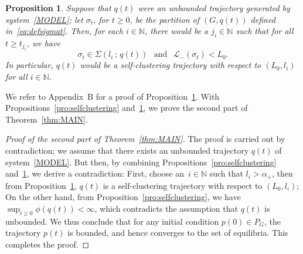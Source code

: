 \documentclass[10pt,twocolumn,twoside]{IEEEtran}
\newtheorem{pro}{Proposition}
\renewcommand{\cal}{\mathcal}
\renewcommand{\(}{\left (}
\renewcommand{\)}{\right )}
\renewcommand{\;}{\,;\,}
\newcommand{\N}{\mathbb{N}}
\begin{document}
\begin{pro}\label{pro:relatepartitiontodynamicalsystem}
Suppose that $q(t)$ were an unbounded trajectory generated by system~\eqref{MODEL};   
let $\sigma_{t}$, for $t\ge 0$, be the partition of $(G,q(t))$ defined in~\eqref{eq:defsigmat}. Then, for each $i\in \N$, there would be a $j_i\in \N$ such that for all $t \ge t_{j_i}$, we have
\begin{equation*}\label{eq:contradictioncondition1}
\sigma_t\in \Sigma(l_i\; q(t)) \hspace{5pt} \mbox{ and } \hspace{5pt}  \cal{L}_-(\sigma_t) <  L_0. 
\end{equation*}
In particular, $q(t)$ would be a self-clustering trajectory with respect to $(L_0, l_i)$ for all $i\in \N$. 
\end{pro}



We refer to Appendix~B for a proof of Proposition~\ref{pro:relatepartitiontodynamicalsystem}. With Propositions~\ref{pro:selfclustering} and~\ref{pro:relatepartitiontodynamicalsystem}, we prove the second part of Theorem~\ref{thm:MAIN}. 


\begin{proof}[Proof of the second part of Theorem~\ref{thm:MAIN}]
The proof is carried out by contradiction; we assume that there exists an unbounded trajectory $q(t)$ of system~\eqref{MODEL}.  But then, 
by combining Propositions~\ref{pro:selfclustering} and~\ref{pro:relatepartitiontodynamicalsystem}, we derive a contradiction:  First, choose an~$i\in \N$ such that $l_i > \alpha_+$, then from Proposition~\ref{pro:relatepartitiontodynamicalsystem}, $q(t)$ is a self-clustering trajectory with respect to $(L_0, l_i)$; On the other hand, from Proposition~\ref{pro:selfclustering}, we have
$
\sup_{t \ge 0} \phi(q(t))  < \infty  
$,  
which contradicts the assumption that $q(t)$ is unbounded. 
We thus conclude that for any initial condition $p(0)\in P_G$, the trajectory $p(t)$ is bounded, and hence converges to the set of equilibria. This completes the proof. 
\end{proof}
















 
\end{document}

